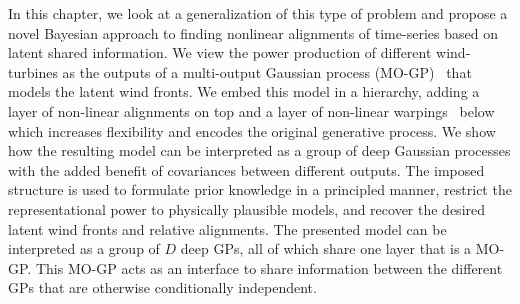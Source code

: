 In this chapter, we look at a generalization of this type of problem and propose a novel Bayesian approach to finding nonlinear alignments of time-series based on latent shared information.
We view the power production of different wind-turbines as the outputs of a multi-output Gaussian process (MO-GP)~\parencite{boyle_multiple_2005,alvarez_kernels_2011} that models the latent wind fronts.
We embed this model in a hierarchy, adding a layer of non-linear alignments on top and a layer of non-linear warpings~\parencite{snelson_warped_2004,lazaro-gredilla_bayesian_2012} below which increases flexibility and encodes the original generative process.
We show how the resulting model can be interpreted as a group of deep Gaussian processes with the added benefit of covariances between different outputs.
The imposed structure is used to formulate prior knowledge in a principled manner, restrict the representational power to physically plausible models, and recover the desired latent wind fronts and relative alignments.
The presented model can be interpreted as a group of $D$ deep GPs, all of which share one layer that is a MO-GP.
This MO-GP acts as an interface to share information between the different GPs that are otherwise conditionally independent.


